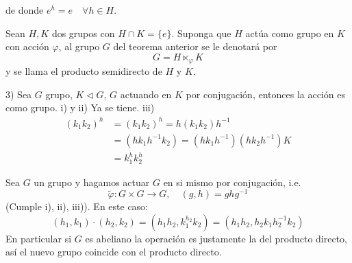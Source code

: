 \begin{defi}
	de donde $e^h = e \quad \forall h \in H$.

	Sean $H, K$ dos grupos con $H \cap K = \{e\}$. Suponga que $H$ actúa como grupo en $K$ con acción $\varphi$, al grupo $G$ del teorema anterior se le denotará por
	\begin{equation*}
		G = H \ltimes_\varphi K
	\end{equation*}
	y se llama el producto semidirecto de $H$ y $K$.
\end{defi}

\begin{eje}
	3) Sea $G$ grupo, $K \triangleleft G$, $G$ actuando en $K$ por conjugación, entonces la acción es como grupo.
	i) y ii) Ya se tiene.
	iii)
	\begin{align*}
		(k_1 k_2)^h & = (k_1 k_2)^h = h(k_1 k_2)h^{-1}                     \\
		            & = (h k_1 h^{-1} k_2) = (h k_1 h^{-1})(h k_2 h^{-1})K \\
		            & = k_1^h k_2^h
	\end{align*}

\end{eje}

\begin{eje}
	Sea $G$ un grupo y hagamos actuar $G$ en si mismo por conjugación, i.e.
	\begin{equation*}
		\tilde{\varphi}: G \times G \to G, \quad (g, h) = ghg^{-1}
	\end{equation*}
	(Cumple i), ii), iii)).
	En este caso:
	\begin{equation*}
		(h_1, k_1) \cdot (h_2, k_2) = (h_1 h_2, k_1^{h_2} k_2) = (h_1 h_2, h_2 k_1 h_2^{-1} k_2)
	\end{equation*}
	En particular si $G$ es abeliano la operación es justamente la del producto directo, así el nuevo grupo coincide con el producto directo.
\end{eje}


